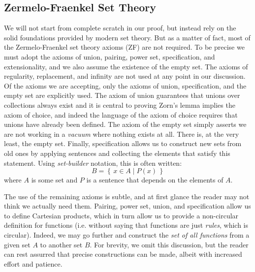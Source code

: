 \documentclass{article}
\theoremstyle{definition}
\begin{document}
        \subsection{Zermelo-Fraenkel Set Theory}
            We will not start from complete scratch in our proof, but instead
            rely on the solid foundations provided by modern set theory.
            But as a matter of fact, most of the Zermelo-Fraenkel set theory
            axioms (ZF) are not required. To be precise we must
            adopt the axioms of union, pairing, power set, specification,
            and extensionality, and we also assume the existence of the empty
            set. The axioms of regularity, replacement, and infinity are not
            used at any point in our discussion. Of the axioms we are accepting,
            only the axioms of union, specification, and the empty set are
            explicitly used.
            The axiom of union guarantees that unions over collections always
            exist and it is central to proving Zorn's lemma implies the axiom
            of choice, and indeed the language of the axiom of choice requires
            that unions have already been defined. The axiom of the empty set
            simply asserts we are not working in a \textit{vacuum} where
            nothing exists at all. There is, at the very least, the empty set.
            Finally, specification allows us to construct new sets from old
            ones by applying sentences and collecting the elements that
            satisfy this statement. Using \textit{set-builder} notation,
            this is often written:
            \begin{equation}
                B=\left\{\,
                    x\in{A}\;|\;P(x)\,
                \right\}
            \end{equation}
            where $A$ is some set and $P$ is a sentence that depends on the
            elements of $A$.
            \par\hfill\par
            The use of the remaining axioms is subtle, and at first glance the
            reader may not think we actually need them. Pairing, power set,
            union, and specification allow us to define Cartesian products,
            which in turn allow us to provide a non-circular definition for
            functions (i.e. without saying that functions are just
            \textit{rules}, which is circular). Indeed, we may go further and
            construct the \textit{set of all functions} from a given set $A$
            to another set $B$. For brevity, we omit this discussion, but the
            reader can rest assurred that precise constructions can be made,
            albeit with increased effort and patience.
\end{document}
